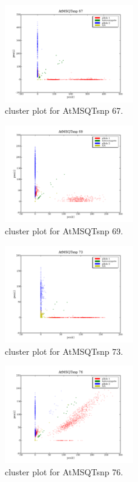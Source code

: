 \begin{figure}[H]
\includegraphics[width=0.5\textwidth]{figures/cluster_plot_AtMSQTsnp_67.png}
\caption{cluster plot for AtMSQTsnp 67.} \label{flAtMSQTsnp67}
\end{figure}
\begin{figure}[H]
\includegraphics[width=0.5\textwidth]{figures/cluster_plot_AtMSQTsnp_69.png}
\caption{cluster plot for AtMSQTsnp 69.} \label{flAtMSQTsnp69}
\end{figure}
\begin{figure}[H]
\includegraphics[width=0.5\textwidth]{figures/cluster_plot_AtMSQTsnp_73.png}
\caption{cluster plot for AtMSQTsnp 73.} \label{flAtMSQTsnp73}
\end{figure}
\begin{figure}[H]
\includegraphics[width=0.5\textwidth]{figures/cluster_plot_AtMSQTsnp_76.png}
\caption{cluster plot for AtMSQTsnp 76.} \label{flAtMSQTsnp76}
\end{figure}
